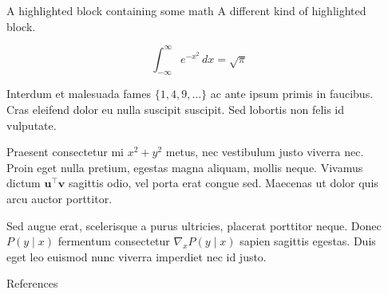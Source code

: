 \documentclass[final]{beamer}
\newlength{\sepwidth}
\newlength{\colwidth}
\newcommand{\separatorcolumn}{\begin{column}{\sepwidth}\end{column}}
\begin{document}
\begin{frame}[t,fragile]
\begin{columns}[t]
\begin{column}{\colwidth}
\begin{exampleblock}{A highlighted block containing some math}
    A different kind of highlighted block.

    $$
    \int_{-\infty}^{\infty} e^{-x^2}\,dx = \sqrt{\pi}
    $$

    Interdum et malesuada fames $\{1, 4, 9, \ldots\}$ ac ante ipsum primis in
    faucibus. Cras eleifend dolor eu nulla suscipit suscipit. Sed lobortis non
    felis id vulputate.


    Praesent consectetur mi $x^2 + y^2$ metus, nec vestibulum justo viverra
    nec. Proin eget nulla pretium, egestas magna aliquam, mollis neque. Vivamus
    dictum $\mathbf{u}^\intercal\mathbf{v}$ sagittis odio, vel porta erat
    congue sed. Maecenas ut dolor quis arcu auctor porttitor.


    Sed augue erat, scelerisque a purus ultricies, placerat porttitor neque.
    Donec $P(y \mid x)$ fermentum consectetur $\nabla_x P(y \mid x)$ sapien
    sagittis egestas. Duis eget leo euismod nunc viverra imperdiet nec id
    justo.

  \end{exampleblock}

 

  \begin{block}{References}

    \nocite{*}
    \footnotesize{}

  \end{block}

\end{column}
\separatorcolumn



\end{columns}
\end{frame}
\end{document}

